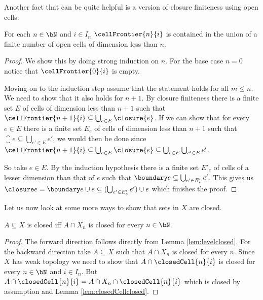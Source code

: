 Another fact that can be quite helpful is a version of closure finiteness using open cells:

\begin{lem} \label{lem:Frontiersubsetopen}
    For each $n \in \bN$ and $i \in I_n$ $\cellFrontier{n}{i}$ is contained in the union of a finite number of open cells of dimension less than $n$.
\end{lem}
\begin{proof}
    We show this by doing strong induction on $n$.
    For the base case $n = 0$ notice that $\cellFrontier{0}{i}$ is empty.

    Moving on to the induction step assume that the statement holds for all $m \le n$.
    We need to show that it also holds for $n + 1$.
    By closure finiteness there is a finite set $E$ of cells of dimension less than $n + 1$ such that $\cellFrontier{n + 1}{i} \subseteq \bigcup_{e \in E}\closure{e}$.
    If we can show that for every $e \in E$ there is a finite set $E_e$ of cells of dimension less than $n + 1$ such that $\closure{e} \subseteq \bigcup_{e' \in E}e'$, we would then be done since $\cellFrontier{n + 1}{i} \subseteq \bigcup_{e \in E}\closure{e} \subseteq \bigcup_{e \in E}\bigcup_{e' \in E}e'$.

    So take $e \in E$.
    By the induction hypothesis there is a finite set $E'_e$ of cells of a lesser dimension than that of $e$ such that $\boundary e \subseteq \bigcup_{e' \in E'_e}e'$.
    This gives us $\closure e = \boundary e \cup e \subseteq (\bigcup_{e' \in E'_e}e') \cup e$ which finishes the proof.
\end{proof}

Let us now look at some more ways to show that sets in $X$ are closed. 

\begin{lem}\label{lem:closediffskeleton}
    $A \subseteq X$ is closed iff $A \cap X_n$ is closed for every $n \in \bN$.
\end{lem}
\begin{proof}
    The forward direction follows directly from Lemma \ref{lem:levelclosed}. 
    For the backward direction take $A \subseteq X$ such that $A \cap X_n$ is closed for every $n$.
    Since $X$ has weak topology we need to show that $A \cap \closedCell{n}{i}$ is closed for every $n \in \bN$ and $i \in I_n$. 
    But $A \cap \closedCell{n}{i} = A \cap X_n \cap \closedCell{n}{i}$ which is closed by assumption and Lemma \ref{lem:closedCellclosed}.
\end{proof}


